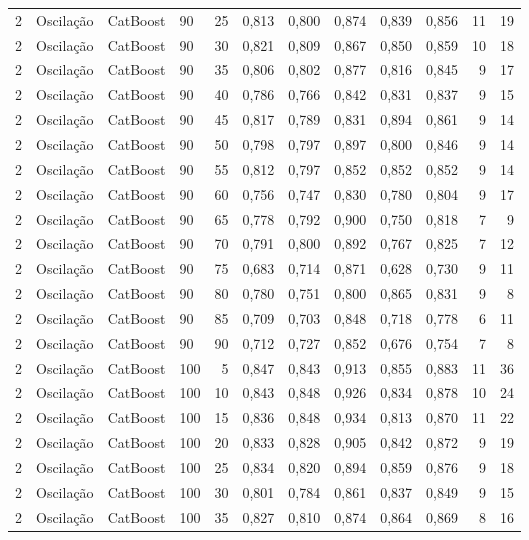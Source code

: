 \begin{longtable}{ccclrrrrrrrr}
2 & Oscilação & CatBoost & 90 & 25 & 0,813 & 0,800 & 0,874 & 0,839 & 0,856 & 11 & 19 \\
2 & Oscilação & CatBoost & 90 & 30 & 0,821 & 0,809 & 0,867 & 0,850 & 0,859 & 10 & 18 \\
2 & Oscilação & CatBoost & 90 & 35 & 0,806 & 0,802 & 0,877 & 0,816 & 0,845 & 9 & 17 \\
2 & Oscilação & CatBoost & 90 & 40 & 0,786 & 0,766 & 0,842 & 0,831 & 0,837 & 9 & 15 \\
2 & Oscilação & CatBoost & 90 & 45 & 0,817 & 0,789 & 0,831 & 0,894 & 0,861 & 9 & 14 \\
2 & Oscilação & CatBoost & 90 & 50 & 0,798 & 0,797 & 0,897 & 0,800 & 0,846 & 9 & 14 \\
2 & Oscilação & CatBoost & 90 & 55 & 0,812 & 0,797 & 0,852 & 0,852 & 0,852 & 9 & 14 \\
2 & Oscilação & CatBoost & 90 & 60 & 0,756 & 0,747 & 0,830 & 0,780 & 0,804 & 9 & 17 \\
2 & Oscilação & CatBoost & 90 & 65 & 0,778 & 0,792 & 0,900 & 0,750 & 0,818 & 7 & 9 \\
2 & Oscilação & CatBoost & 90 & 70 & 0,791 & 0,800 & 0,892 & 0,767 & 0,825 & 7 & 12 \\
2 & Oscilação & CatBoost & 90 & 75 & 0,683 & 0,714 & 0,871 & 0,628 & 0,730 & 9 & 11 \\
2 & Oscilação & CatBoost & 90 & 80 & 0,780 & 0,751 & 0,800 & 0,865 & 0,831 & 9 & 8 \\
2 & Oscilação & CatBoost & 90 & 85 & 0,709 & 0,703 & 0,848 & 0,718 & 0,778 & 6 & 11 \\
2 & Oscilação & CatBoost & 90 & 90 & 0,712 & 0,727 & 0,852 & 0,676 & 0,754 & 7 & 8 \\
2 & Oscilação & CatBoost & 100 & 5 & 0,847 & 0,843 & 0,913 & 0,855 & 0,883 & 11 & 36 \\
2 & Oscilação & CatBoost & 100 & 10 & 0,843 & 0,848 & 0,926 & 0,834 & 0,878 & 10 & 24 \\
2 & Oscilação & CatBoost & 100 & 15 & 0,836 & 0,848 & 0,934 & 0,813 & 0,870 & 11 & 22 \\
2 & Oscilação & CatBoost & 100 & 20 & 0,833 & 0,828 & 0,905 & 0,842 & 0,872 & 9 & 19 \\
2 & Oscilação & CatBoost & 100 & 25 & 0,834 & 0,820 & 0,894 & 0,859 & 0,876 & 9 & 18 \\
2 & Oscilação & CatBoost & 100 & 30 & 0,801 & 0,784 & 0,861 & 0,837 & 0,849 & 9 & 15 \\
2 & Oscilação & CatBoost & 100 & 35 & 0,827 & 0,810 & 0,874 & 0,864 & 0,869 & 8 & 16 \\

\end{longtable}
